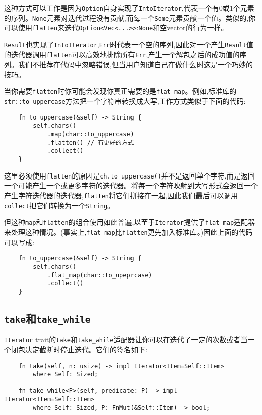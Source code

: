 这种方式可以工作是因为\texttt{Option}自身实现了\texttt{IntoIterator},代表一个有0或1个元素的序列。\texttt{None}元素对迭代过程没有贡献,而每一个\texttt{Some}元素贡献一个值。类似的,你可以使用\texttt{flatten}来迭代\texttt{Option<Vec<...>>}:\texttt{None}和空vector的行为一样。

\texttt{Result}也实现了\texttt{IntoIterator},\texttt{Err}时代表一个空的序列,因此对一个产生\texttt{Result}值的迭代器调用\texttt{flatten}可以高效地排除所有\texttt{Err},产生一个解包之后的成功值的序列。我们不推荐在代码中忽略错误,但当用户知道自己在做什么时这是一个巧妙的技巧。

当你需要\texttt{flatten}时你可能会发现你真正需要的是\texttt{flat\_map}。例如,标准库的\texttt{str::to\_uppercase}方法把一个字符串转换成大写,工作方式类似于下面的代码:
\begin{verbatim}
    fn to_uppercase(&self) -> String {
        self.chars()
            .map(char::to_uppercase)
            .flatten() // 有更好的方式
            .collect()
    }
\end{verbatim}

这里必须使用\texttt{flatten}的原因是\texttt{ch.to\_uppercase()}并不是返回单个字符,而是返回一个可能产生一个或更多字符的迭代器。将每一个字符映射到大写形式会返回一个产生字符迭代器的迭代器,\texttt{flatten}将它们拼接在一起,因此我们最后可以调用\texttt{collect}把它们转换为一个\texttt{String}。

但这种\texttt{map}和\texttt{flatten}的组合使用如此普遍,以至于\texttt{Iterator}提供了\texttt{flat\_map}适配器来处理这种情况。(事实上,\texttt{flat\_map}比\texttt{flatten}更先加入标准库。)因此上面的代码可以写成:
\begin{verbatim}
    fn to_uppercase(&self) -> String {
        self.chars()
            .flat_map(char::to_upeprcase)
            .collect()
    }
\end{verbatim}

\subsection{\texttt{take}和\texttt{take\_while}}
\texttt{Iterator} trait的\texttt{take}和\texttt{take\_while}适配器让你可以在迭代了一定的次数或者当一个闭包决定截断时停止迭代。它们的签名如下:
\begin{verbatim}
    fn take(self, n: usize) -> impl Iterator<Item=Self::Item>
        where Self: Sized;
    
    fn take_while<P>(self, predicate: P) -> impl Iterator<Item=Self::Item>
        where Self: Sized, P: FnMut(&Self::Item) -> bool;
\end{verbatim}

